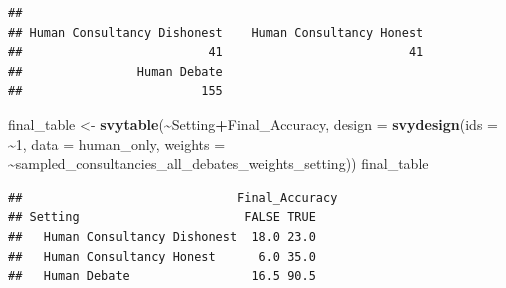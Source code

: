\documentclass[
]{article}
\newenvironment{Shaded}{\begin{snugshade}}{\end{snugshade}}
\newcommand{\AttributeTok}[1]{\textcolor[rgb]{0.13,0.29,0.53}{#1}}
\newcommand{\ConstantTok}[1]{\textcolor[rgb]{0.56,0.35,0.01}{#1}}
\newcommand{\DecValTok}[1]{\textcolor[rgb]{0.00,0.00,0.81}{#1}}
\newcommand{\FunctionTok}[1]{\textcolor[rgb]{0.13,0.29,0.53}{\textbf{#1}}}
\newcommand{\NormalTok}[1]{#1}
\newcommand{\OtherTok}[1]{\textcolor[rgb]{0.56,0.35,0.01}{#1}}
\newcommand{\SpecialCharTok}[1]{\textcolor[rgb]{0.81,0.36,0.00}{\textbf{#1}}}
\newcommand{\StringTok}[1]{\textcolor[rgb]{0.31,0.60,0.02}{#1}}
\begin{document}
\begin{Shaded}
\end{Shaded}

\begin{verbatim}
## 
## Human Consultancy Dishonest    Human Consultancy Honest 
##                          41                          41 
##                Human Debate 
##                         155
\end{verbatim}

\begin{Shaded}
\begin{Highlighting}[]
\NormalTok{final\_table }\OtherTok{\textless{}{-}} \FunctionTok{svytable}\NormalTok{(}\SpecialCharTok{\textasciitilde{}}\NormalTok{Setting}\SpecialCharTok{+}\NormalTok{Final\_Accuracy, }
                        \AttributeTok{design =} \FunctionTok{svydesign}\NormalTok{(}\AttributeTok{ids =} \SpecialCharTok{\textasciitilde{}}\DecValTok{1}\NormalTok{, }
                                           \AttributeTok{data =}\NormalTok{ human\_only,}
                                           \AttributeTok{weights =} \SpecialCharTok{\textasciitilde{}}\NormalTok{sampled\_consultancies\_all\_debates\_weights\_setting))}
\NormalTok{final\_table}
\end{Highlighting}
\end{Shaded}

\begin{verbatim}
##                              Final_Accuracy
## Setting                       FALSE TRUE
##   Human Consultancy Dishonest  18.0 23.0
##   Human Consultancy Honest      6.0 35.0
##   Human Debate                 16.5 90.5
\end{verbatim}
\end{document}
